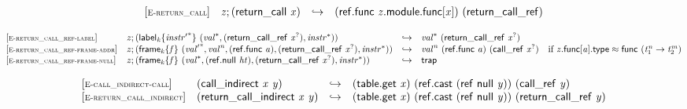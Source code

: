 \vspace{1ex}

$$
\begin{array}{@{}l@{}lcl@{}l@{}}
{[\textsc{\scriptsize E{-}return\_call}]} \quad & {\mathit{z}} ; (\mathsf{return\_call}~{\mathit{x}}) &\hookrightarrow& (\mathsf{ref.func}~{\mathit{z}}.\mathsf{module}.\mathsf{func}[{\mathit{x}}])~(\mathsf{return\_call\_ref}) &  \\
\end{array}
$$

\vspace{1ex}

$$
\begin{array}{@{}l@{}lcl@{}l@{}}
{[\textsc{\scriptsize E{-}return\_call\_ref{-}label}]} \quad & {\mathit{z}} ; ({{\mathsf{label}}_{{\mathit{k}}}}{\{{{\mathit{instr}'}^\ast}\}}~({{\mathit{val}}^\ast}, (\mathsf{return\_call\_ref}~{{\mathit{x}}^?}), {{\mathit{instr}}^\ast})) &\hookrightarrow& {{\mathit{val}}^\ast}~(\mathsf{return\_call\_ref}~{{\mathit{x}}^?}) &  \\
{[\textsc{\scriptsize E{-}return\_call\_ref{-}frame{-}addr}]} \quad & {\mathit{z}} ; ({{\mathsf{frame}}_{{\mathit{k}}}}{\{{\mathit{f}}\}}~({{\mathit{val}'}^\ast}, {{\mathit{val}}^{{\mathit{n}}}}, (\mathsf{ref.func}~{\mathit{a}}), (\mathsf{return\_call\_ref}~{{\mathit{x}}^?}), {{\mathit{instr}}^\ast})) &\hookrightarrow& {{\mathit{val}}^{{\mathit{n}}}}~(\mathsf{ref.func}~{\mathit{a}})~(\mathsf{call\_ref}~{{\mathit{x}}^?}) &\quad
  \mbox{if}~{\mathit{z}}.\mathsf{func}[{\mathit{a}}].\mathsf{type} \approx \mathsf{func}~({{\mathit{t}}_{{1}}^{{\mathit{n}}}} \rightarrow {{\mathit{t}}_{{2}}^{{\mathit{m}}}}) \\
{[\textsc{\scriptsize E{-}return\_call\_ref{-}frame{-}null}]} \quad & {\mathit{z}} ; ({{\mathsf{frame}}_{{\mathit{k}}}}{\{{\mathit{f}}\}}~({{\mathit{val}}^\ast}, (\mathsf{ref.null}~{\mathit{ht}}), (\mathsf{return\_call\_ref}~{{\mathit{x}}^?}), {{\mathit{instr}}^\ast})) &\hookrightarrow& \mathsf{trap} &  \\
\end{array}
$$

\vspace{1ex}

$$
\begin{array}{@{}l@{}lcl@{}l@{}}
{[\textsc{\scriptsize E{-}call\_indirect{-}call}]} \quad & (\mathsf{call\_indirect}~{\mathit{x}}~{\mathit{y}}) &\hookrightarrow& (\mathsf{table.get}~{\mathit{x}})~(\mathsf{ref.cast}~(\mathsf{ref}~\mathsf{null}~{\mathit{y}}))~(\mathsf{call\_ref}~{\mathit{y}}) &  \\
{[\textsc{\scriptsize E{-}return\_call\_indirect}]} \quad & (\mathsf{return\_call\_indirect}~{\mathit{x}}~{\mathit{y}}) &\hookrightarrow& (\mathsf{table.get}~{\mathit{x}})~(\mathsf{ref.cast}~(\mathsf{ref}~\mathsf{null}~{\mathit{y}}))~(\mathsf{return\_call\_ref}~{\mathit{y}}) &  \\
\end{array}
$$

